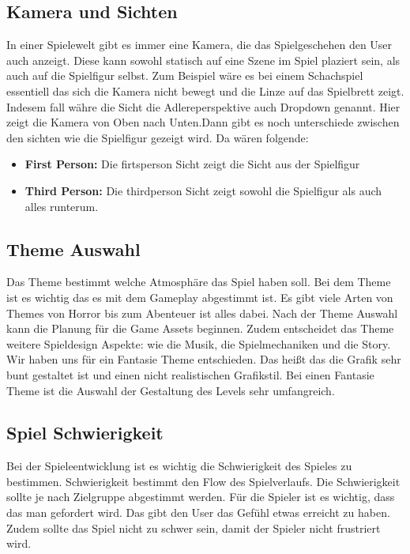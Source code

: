 
\subsection{Kamera und Sichten}
In einer Spielewelt gibt es immer eine Kamera, die das Spielgeschehen den User auch anzeigt. Diese kann sowohl statisch auf eine Szene im Spiel plaziert sein, als auch auf die Spielfigur selbst. Zum Beispiel wäre es bei einem Schachspiel essentiell das sich die Kamera nicht bewegt und die Linze auf das Spielbrett zeigt. Indesem fall währe die Sicht die Adlereperspektive auch Dropdown genannt. Hier zeigt die Kamera von Oben nach Unten.Dann gibt es noch unterschiede zwischen den sichten wie die Spielfigur gezeigt wird. Da wären folgende:

\begin{itemize}
    \item \textbf{First Person:}
    \noindent Die firtsperson Sicht zeigt die Sicht aus der Spielfigur
    \item \textbf{Third Person:}
    \noindent Die thirdperson Sicht zeigt sowohl die Spielfigur als auch alles runterum. 
\end{itemize}

\subsection{Theme Auswahl}
Das Theme bestimmt welche Atmosphäre das Spiel haben soll. Bei dem Theme ist es wichtig das es mit dem Gameplay abgestimmt ist. Es gibt viele Arten von Themes von Horror bis zum Abenteuer ist alles dabei. Nach der Theme Auswahl kann die Planung für die  Game Assets beginnen. Zudem entscheidet das Theme weitere Spieldesign Aspekte: wie die Musik, die Spielmechaniken und die  Story. Wir haben uns für ein Fantasie Theme entschieden. Das heißt das die Grafik sehr bunt gestaltet ist und einen nicht realistischen Grafikstil. Bei einen Fantasie Theme ist die Auswahl der Gestaltung des Levels sehr umfangreich. 


\subsection{Spiel Schwierigkeit}

Bei der Spieleentwicklung ist es wichtig die Schwierigkeit des Spieles zu bestimmen. Schwierigkeit bestimmt den Flow des Spielverlaufs. Die Schwierigkeit sollte je nach Zielgruppe abgestimmt werden. Für die Spieler ist es wichtig, dass das man gefordert wird. Das gibt den User das Gefühl etwas erreicht zu haben. Zudem sollte das Spiel nicht zu schwer sein, damit der Spieler nicht frustriert wird. 

